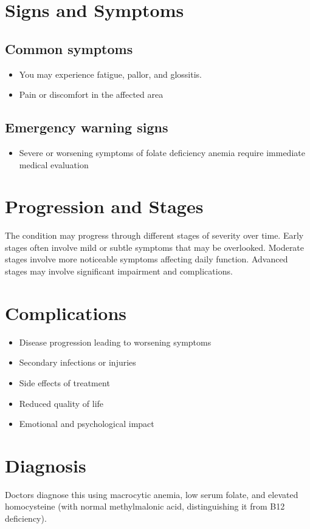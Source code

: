 \section{Signs and Symptoms}
\subsection{Common symptoms}
\begin{itemize}[noitemsep]
  \item You may experience fatigue, pallor, and glossitis.
  \item Pain or discomfort in the affected area
  \end{itemize}
\subsection{Emergency warning signs}
\begin{itemize}[noitemsep]
  \item Severe or worsening symptoms of folate deficiency anemia require immediate medical evaluation
\end{itemize}
\section{Progression and Stages}
The condition may progress through different stages of severity over time. Early stages often involve mild or subtle symptoms that may be overlooked. Moderate stages involve more noticeable symptoms affecting daily function. Advanced stages may involve significant impairment and complications.
\section{Complications}
\begin{itemize}[noitemsep]
  \item Disease progression leading to worsening symptoms
  \item Secondary infections or injuries
  \item Side effects of treatment
  \item Reduced quality of life
  \item Emotional and psychological impact
\end{itemize}
\section{Diagnosis}
Doctors diagnose this using macrocytic anemia, low serum folate, and elevated homocysteine (with normal methylmalonic acid, distinguishing it from B12 deficiency).

